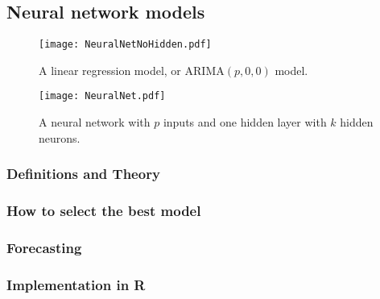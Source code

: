\subsection{Neural network models}

\begin{figure}[H]
\texttt{[image: NeuralNetNoHidden.pdf]}
\caption{A linear regression model, or ARIMA$(p,0,0)$ model.}
\end{figure}

\begin{figure}[H]
\texttt{[image: NeuralNet.pdf]}
\caption{A neural network with $p$ inputs and one hidden layer with $k$ hidden neurons.}
\end{figure}

\subsubsection{Definitions and Theory}

\subsubsection{How to select the best model}

\subsubsection{Forecasting}

\subsubsection{Implementation in R}

